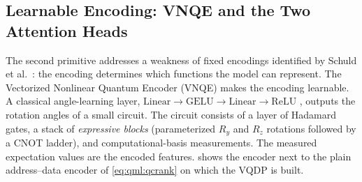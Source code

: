 \subsection{Learnable Encoding: VNQE and the Two Attention Heads}\label{sec:qml:vqt:heads}

The second primitive addresses a weakness of fixed encodings identified by Schuld et al.~\cite{schuld2021encoding}: the encoding determines which functions the model can represent. The Vectorized Nonlinear Quantum Encoder (VNQE) makes the encoding learnable. A classical angle-learning layer, $\mathrm{Linear} \to \mathrm{GELU} \to \mathrm{Linear} \to \mathrm{ReLU}$ \cite{hendrycks2016gelu}, outputs the rotation angles of a small circuit. The circuit consists of a layer of Hadamard gates, a stack of \emph{expressive blocks} (parameterized $R_y$ and $R_z$ rotations followed by a CNOT ladder), and computational-basis measurements. The measured expectation values are the encoded features.  shows the encoder next to the plain address--data encoder of \cref{eq:qml:qcrank} on which the VQDP is built.

